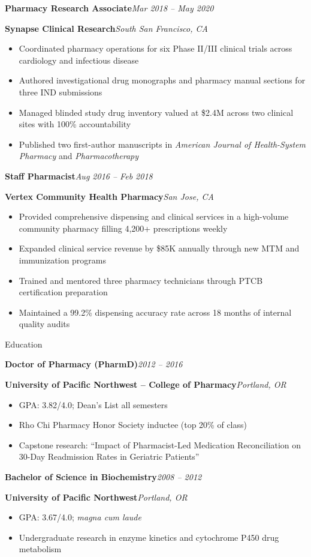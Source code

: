 \documentclass[11pt,letterpaper]{article}
\newcommand{\entryheader}[4]{%
  \textbf{#1}\hfill\textit{#2}\par
  \textbf{#3}\hfill\textit{#4}\par\vspace{2pt}%
}
\begin{document}
\entryheader{Pharmacy Research Associate}{Mar 2018 -- May 2020}{Synapse Clinical Research}{South San Francisco, CA}
\begin{itemize}
  \item Coordinated pharmacy operations for six Phase II/III clinical trials across cardiology and infectious disease
  \item Authored investigational drug monographs and pharmacy manual sections for three IND submissions
  \item Managed blinded study drug inventory valued at \$2.4M across two clinical sites with 100\% accountability
  \item Published two first-author manuscripts in \textit{American Journal of Health-System Pharmacy} and \textit{Pharmacotherapy}
\end{itemize}

\entryheader{Staff Pharmacist}{Aug 2016 -- Feb 2018}{Vertex Community Health Pharmacy}{San Jose, CA}
\begin{itemize}
  \item Provided comprehensive dispensing and clinical services in a high-volume community pharmacy filling 4,200+ prescriptions weekly
  \item Expanded clinical service revenue by \$85K annually through new MTM and immunization programs
  \item Trained and mentored three pharmacy technicians through PTCB certification preparation
  \item Maintained a 99.2\% dispensing accuracy rate across 18 months of internal quality audits
\end{itemize}

\begin{sectionbox}
  Education
\end{sectionbox}

\entryheader{Doctor of Pharmacy (PharmD)}{2012 -- 2016}{University of Pacific Northwest -- College of Pharmacy}{Portland, OR}
\begin{itemize}
  \item GPA: 3.82/4.0; Dean's List all semesters
  \item Rho Chi Pharmacy Honor Society inductee (top 20\% of class)
  \item Capstone research: ``Impact of Pharmacist-Led Medication Reconciliation on 30-Day Readmission Rates in Geriatric Patients''
\end{itemize}

\entryheader{Bachelor of Science in Biochemistry}{2008 -- 2012}{University of Pacific Northwest}{Portland, OR}
\begin{itemize}
  \item GPA: 3.67/4.0; \textit{magna cum laude}
  \item Undergraduate research in enzyme kinetics and cytochrome P450 drug metabolism
\end{itemize}
\end{document}
